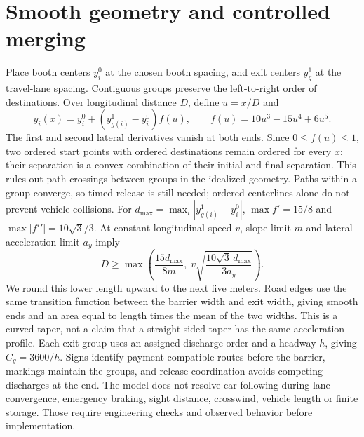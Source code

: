 \documentclass[12pt,letterpaper]{article}
\begin{document}
\section{Smooth geometry and controlled merging}
Place booth centers $y_i^0$ at the chosen booth spacing, and exit centers $y_g^1$ at the travel-lane spacing. Contiguous groups preserve the left-to-right order of destinations. Over longitudinal distance $D$, define $u=x/D$ and
\begin{equation}
y_i(x)=y_i^0+(y_{g(i)}^1-y_i^0)f(u),\qquad
f(u)=10u^3-15u^4+6u^5.\label{eq:path}
\end{equation}
The first and second lateral derivatives vanish at both ends. Since $0\le f(u)\le1$, two ordered start points with ordered destinations remain ordered for every $x$: their separation is a convex combination of their initial and final separation. This rules out path crossings between groups in the idealized geometry. Paths within a group converge, so timed release is still needed; ordered centerlines alone do not prevent vehicle collisions.
For $d_{\max}=\max_i|y_{g(i)}^1-y_i^0|$, $\max f\prime=15/8$ and $\max|f\prime\prime|=10\sqrt3/3$. At constant longitudinal speed $v$, slope limit $m$ and lateral acceleration limit $a_y$ imply
\begin{equation}
D\ge\max\left(\frac{15d_{\max}}{8m},\;v\sqrt{\frac{10\sqrt3\,d_{\max}}{3a_y}}\right).\label{eq:length}
\end{equation}
We round this lower length upward to the next five meters. Road edges use the same transition function between the barrier width and exit width, giving smooth ends and an area equal to length times the mean of the two widths. This is a curved taper, not a claim that a straight-sided taper has the same acceleration profile.
Each exit group uses an assigned discharge order and a headway $h$, giving $C_g=3600/h$. Signs identify payment-compatible routes before the barrier, markings maintain the groups, and release coordination avoids competing discharges at the end. The model does not resolve car-following during lane convergence, emergency braking, sight distance, crosswind, vehicle length or finite storage. Those require engineering checks and observed behavior before implementation.
\end{document}
